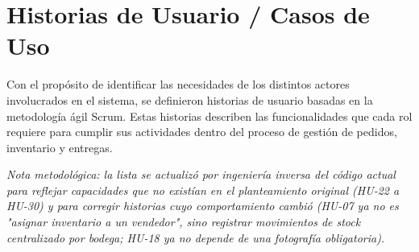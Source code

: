 \documentclass[12pt,a4paper]{report}
\begin{document}
\section{Historias de Usuario / Casos de Uso}

Con el propósito de identificar las necesidades de los distintos actores involucrados en el sistema, se definieron historias de usuario basadas en la metodología ágil Scrum. Estas historias describen las funcionalidades que cada rol requiere para cumplir sus actividades dentro del proceso de gestión de pedidos, inventario y entregas.

\textit{Nota metodológica: la lista se actualizó por ingeniería inversa del código actual para reflejar capacidades que no existían en el planteamiento original (HU-22 a HU-30) y para corregir historias cuyo comportamiento cambió (HU-07 ya no es "asignar inventario a un vendedor", sino registrar movimientos de stock centralizado por bodega; HU-18 ya no depende de una fotografía obligatoria).}
\end{document}
